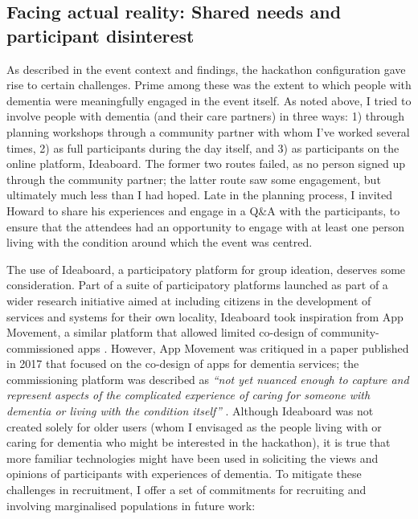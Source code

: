 \subsection{Facing actual reality: Shared needs and participant disinterest}
\label{DiscussionTwo}
As described in the event context and findings, the hackathon configuration gave rise to certain challenges. Prime among these was the extent to which people with dementia were meaningfully engaged in the event itself. As noted above, I tried to involve people with dementia (and their care partners) in three ways: 1) through planning workshops through a community partner with whom I've worked several times, 2) as full participants during the day itself, and 3) as participants on the online platform, Ideaboard. The former two routes failed, as no person signed up through the community partner; the latter route saw some engagement, but ultimately much less than I had hoped. Late in the planning process, I invited Howard to share his experiences and engage in a Q\&A with the participants, to ensure that the attendees had an opportunity to engage with at least one person living with the condition around which the event was centred. 

The use of Ideaboard, a participatory platform for group ideation, deserves some consideration. Part of a suite of participatory platforms launched as part of a wider research initiative aimed at including citizens in the development of services and systems for their own locality, Ideaboard took inspiration from App Movement, a similar platform that allowed limited co-design of community-commissioned apps \citep{garbett_app_2016}. However, App Movement was critiqued in a paper published in 2017 that focused on the co-design of apps for dementia services; the commissioning platform was described as \textit{``not yet nuanced enough to capture and represent aspects of the complicated experience of caring for someone with dementia or living with the condition itself''} \citep{morrissey_care_2017}. Although Ideaboard was not created solely for older users (whom I envisaged as the people living with or caring for dementia who might be interested in the hackathon), it is true that more familiar technologies might have been used in soliciting the views and opinions of participants with experiences of dementia. To mitigate these challenges in recruitment, I offer a set of commitments for recruiting and involving marginalised populations in future work:


